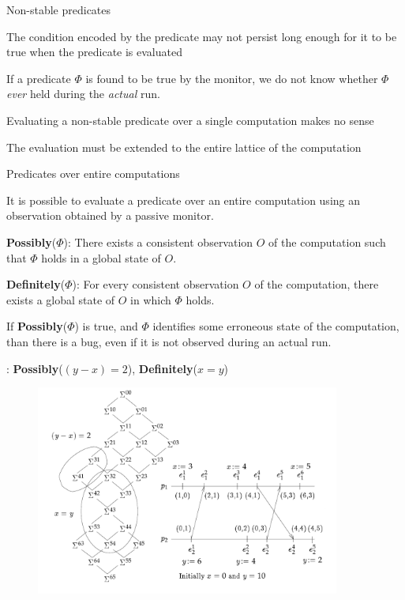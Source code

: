 \begin{frame}{Non-stable predicates}
	

\BI
\item The condition encoded by the predicate may not persist long enough for it to 
  be true when the predicate is evaluated
\item If a predicate $\Phi$ is found to be true by the monitor, we do not know whether 
  $\Phi$ \emph{ever} held during the \emph{actual} run.
\EI

\bigskip
{}

\BI
\item Evaluating a non-stable predicate over a single computation makes no sense
\item The evaluation must be extended to the entire lattice of the computation
\EI

\end{frame}

\begin{frame}{Predicates over entire computations}
	
It is possible to evaluate a predicate over an entire computation using
an observation obtained by a passive monitor.

\BI
\item \alert{{\bf Possibly}($\Phi$)}: There exists a consistent observation $O$ 
  of the computation such that $\Phi$ holds in a global state of $O$.
\item \alert{{\bf Definitely}($\Phi$)}: For every consistent observation $O$ of
  the computation, there exists a global state of $O$ in which $\Phi$ holds.
\EI

\begin{example}[Debugging]
If {\bf Possibly}($\Phi$) is true, and $\Phi$ identifies some erroneous state of the
computation, than there is a bug, even if it is not observed during an actual run.
\end{example}

\end{frame}


\begin{frame}

: {\bf Possibly}($(y-x)=2$), {\bf Definitely}($x=y$)
\begin{figure} 
\includegraphics[width=10cm]{figs/03/figure-16.png}
\end{figure}
\end{frame}

